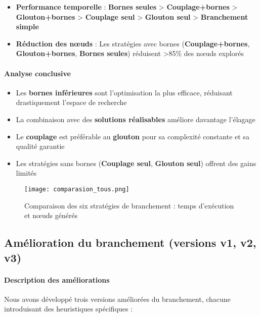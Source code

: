 \documentclass[11pt,a4paper]{article}
\begin{document}
\begin{itemize}
  \item \textbf{Performance temporelle} : \textbf{Bornes seules} > \textbf{Couplage+bornes} > \textbf{Glouton+bornes} > \textbf{Couplage seul} > \textbf{Glouton seul} > \textbf{Branchement simple}
  
  \item \textbf{Réduction des nœuds} : Les stratégies avec bornes (\textbf{Couplage+bornes}, \textbf{Glouton+bornes}, \textbf{Bornes seules}) réduisent >85\% des nœuds explorés
\end{itemize}

\paragraph{Analyse conclusive}
\begin{itemize}
  \item Les \textbf{bornes inférieures} sont l'optimisation la plus efficace, réduisant drastiquement l'espace de recherche
  \item La combinaison avec des \textbf{solutions réalisables} améliore davantage l'élagage
  \item Le \textbf{couplage} est préférable au \textbf{glouton} pour sa complexité constante et sa qualité garantie
  \item Les stratégies sans bornes (\textbf{Couplage seul}, \textbf{Glouton seul}) offrent des gains limités
\end{itemize}

\begin{figure}[H]
  \centering
  \texttt{[image: comparasion\_tous.png]}
  \caption{Comparaison des six stratégies de branchement : temps d'exécution et nœuds générés}
\end{figure}

\subsection{Amélioration du branchement (versions v1, v2, v3)}

\paragraph{Description des améliorations}
Nous avons développé trois versions améliorées du branchement, chacune introduisant des heuristiques spécifiques :
\end{document}
